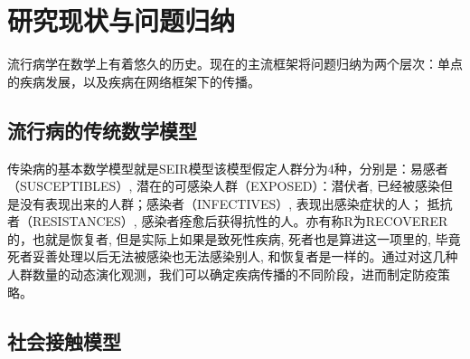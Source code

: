 \chapter{研究现状与问题归纳}

流行病学在数学上有着悠久的历史。现在的主流框架将问题归纳为两个层次：单点的疾病发展，以及疾病在网络框架下的传播。

\section{流行病的传统数学模型}

传染病的基本数学模型就是SEIR模型该模型假定人群分为4种，分别是：易感者（SUSCEPTIBLES）, 潜在的可感染人群（EXPOSED）：潜伏者, 已经被感染但是没有表现出来的人群；感染者（INFECTIVES）, 表现出感染症状的人； 抵抗者（RESISTANCES）, 感染者痊愈后获得抗性的人。亦有称R为RECOVERER的，也就是恢复者, 但是实际上如果是致死性疾病, 死者也是算进这一项里的, 毕竟死者妥善处理以后无法被感染也无法感染别人, 和恢复者是一样的。通过对这几种人群数量的动态演化观测，我们可以确定疾病传播的不同阶段，进而制定防疫策略。

\section{社会接触模型}

